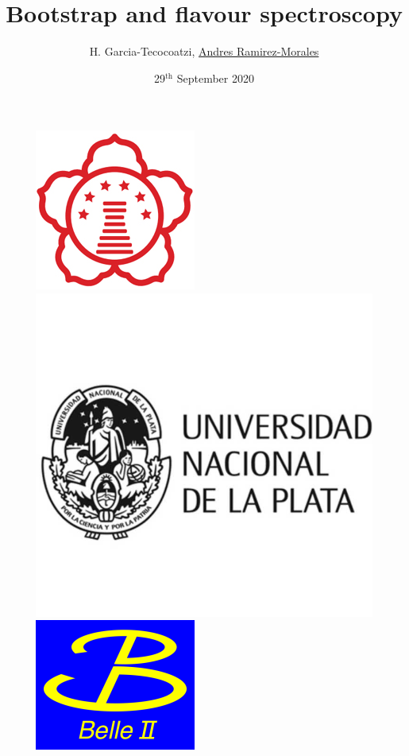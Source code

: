 \documentclass[10pt]{beamer}
\title[Bootstrap and flavour spectroscopy]{Bootstrap and flavour spectroscopy}
\author[Andres Ramirez-Morales]{H. Garcia-Tecocoatzi, \underline{Andres Ramirez-Morales}}
\institute{Kyungpook National University}
\date{29$^{\mathrm{th}}$ September 2020}
\begin{document}
 \begin{frame}
   \begin{figure}
   \hspace{3mm}
   \includegraphics[scale=0.25]{./Figures/knu_logo.jpg}
   \hspace{7mm}
   \includegraphics[scale=0.25]{./Figures/plata.jpg}       
    \hspace{15mm}
   \includegraphics[scale=1.25]{./Figures/belle_logo.png}       

   \end{figure}
  \titlepage   
\end{frame}
\end{document}
